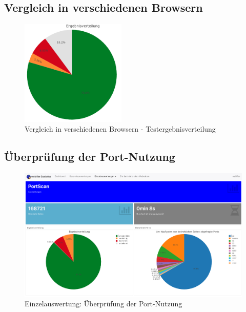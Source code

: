 \subsection{Vergleich in verschiedenen Browsern}
\begin{figure}[H]
  \centering
  \includegraphics[width=5cm]{images/stats/diaheaderinspection}
  \caption{Vergleich in verschiedenen Browsern - Testergebnisverteilung}
  \label{fig:diaheaderinspection}
\end{figure}

\subsection{Überprüfung der Port-Nutzung}
\begin{figure}[H]
  \centering
  \includegraphics[width=15cm]{images/stats/portscan}
  \caption{Einzelauswertung: Überprüfung der Port-Nutzung\protect\footnotemark}
  \label{fig:portscan}
\end{figure}

